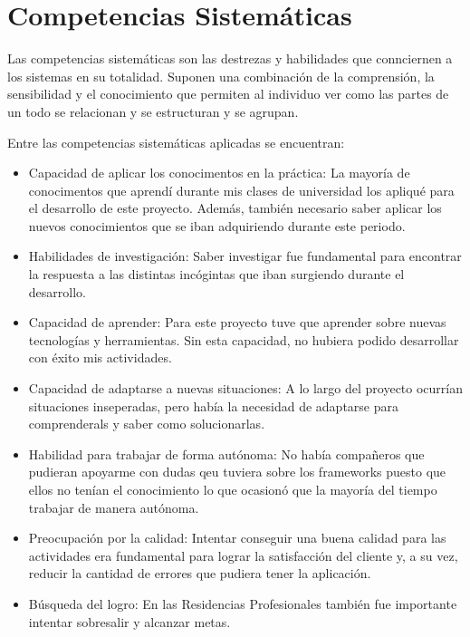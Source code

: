 \section{Competencias Sistemáticas}
Las competencias sistemáticas son las destrezas y habilidades que connciernen a los sistemas en su totalidad. Suponen una combinación de la comprensión, la 
sensibilidad y el conocimiento que permiten al individuo ver como las partes de un todo se relacionan y se estructuran y se agrupan. 

Entre las competencias sistemáticas aplicadas se encuentran: 
    \begin{itemize}
        \item Capacidad de aplicar los conocimentos en la práctica: La mayoría de conocimentos que aprendí durante mis clases de universidad los apliqué para el desarrollo de este proyecto. Además, también necesario saber aplicar los nuevos conocimientos que se iban adquiriendo durante este periodo.
        \item Habilidades de investigación: Saber investigar fue fundamental para encontrar la respuesta a las distintas incógintas que iban surgiendo durante el desarrollo.
        \item Capacidad de aprender: Para este proyecto tuve que aprender sobre nuevas tecnologías y herramientas. Sin esta capacidad, no hubiera podido desarrollar con éxito mis actividades.
        \item Capacidad de adaptarse a nuevas situaciones: A lo largo del proyecto ocurrían situaciones inseperadas, pero había la necesidad de adaptarse para comprenderals y saber como solucionarlas.
        \item Habilidad para trabajar de forma autónoma: No había compañeros que pudieran apoyarme con dudas qeu tuviera sobre los frameworks puesto que ellos no tenían el conocimiento lo que ocasionó que la mayoría del tiempo trabajar de manera autónoma.
        \item Preocupación por la calidad: Intentar conseguir una buena calidad para las actividades era fundamental para lograr la satisfacción del cliente y, a su vez, reducir la cantidad de errores que pudiera tener la aplicación.
        \item Búsqueda del logro: En las Residencias Profesionales también fue importante intentar sobresalir y alcanzar metas.
    \end{itemize}